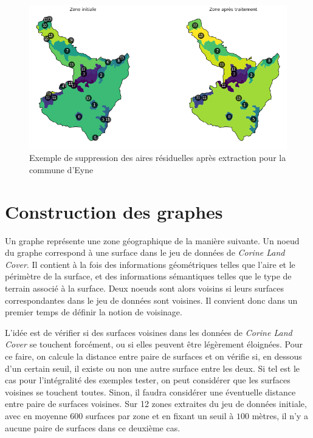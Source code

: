 \begin{figure}[!h]
    \centering
    \includegraphics[scale=0.5]{figures/eyne-sup-residus}
    \caption{Exemple de suppression des aires résiduelles après extraction pour la commune d'Eyne}
    \label{fig:eyne-sup-residus}
\end{figure}


\section{Construction des graphes}







Un graphe représente une zone géographique de la manière suivante.
Un noeud du graphe correspond à une surface dans le jeu de données de \emph{Corine Land Cover}.
Il contient à la fois des informations géométriques telles que l'aire et le périmètre de la surface, et des informations sémantiques telles que le type de terrain associé à la surface.
Deux noeuds sont alors voisins si leurs surfaces correspondantes dans le jeu de données sont voisines.
Il convient donc dans un premier temps de définir la notion de voisinage. %

L'idée est de vérifier si des surfaces voisines dans les données de \emph{Corine Land Cover} se touchent forcément, ou si elles peuvent être légèrement éloignées.
Pour ce faire, on calcule la distance entre paire de surfaces et on vérifie si, en dessous d'un certain seuil, il existe ou non une autre surface entre les deux.
Si tel est le cas pour l'intégralité des exemples tester, on peut considérer que les surfaces voisines se touchent toutes.
Sinon, il faudra considérer une éventuelle distance entre paire de surfaces voisines.
Sur 12 zones extraites du jeu de données initiale, avec en moyenne 600 surfaces par zone et en fixant un seuil à $100$ mètres, il n'y a aucune paire de surfaces dans ce deuxième cas.


